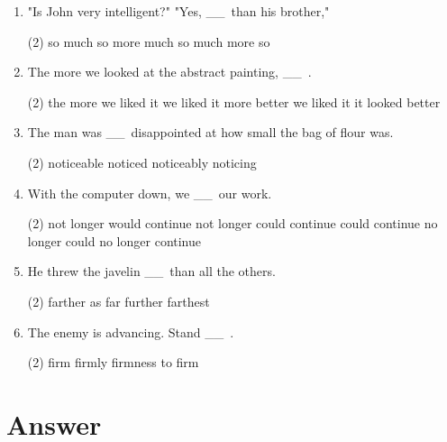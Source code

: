\documentclass{yufa}
\newcommand\ttu{ \_\_\ }
\begin{document}
\begin{enumerate}
\item "Is John very intelligent?" "Yes, \ttu than his brother,"
  \begin{tasks}(2)
    \task so much
    \task so more
    \task much so
    \task much more so
  \end{tasks}

\item The more we looked at the abstract painting, \ttu.
  \begin{tasks}(2)
    \task the more we liked it
    \task we liked it more
    \task better we liked it
    \task it looked better
  \end{tasks}

\item The man was \ttu disappointed at how small the bag of flour was.
  \begin{tasks}(2)
    \task noticeable
    \task noticed
    \task noticeably
    \task noticing
  \end{tasks}

\item With the computer down, we \ttu our work.
  \begin{tasks}(2)
    \task not longer would continue
    \task not longer could continue
    \task could continue no longer
    \task could no longer continue
  \end{tasks}

\item He threw the javelin \ttu than all the others.
  \begin{tasks}(2)
    \task farther
    \task as far
    \task further
    \task farthest
  \end{tasks}

\item The enemy is advancing. Stand \ttu.
  \begin{tasks}(2)
    \task firm
    \task firmly
    \task firmness
    \task to firm
  \end{tasks}

\end{enumerate}

\section{Answer}
\end{document}
